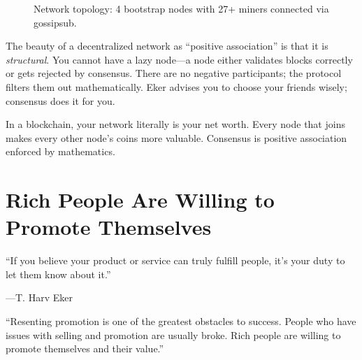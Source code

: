 \documentclass[11pt,a4paper]{article}
\begin{document}
\begin{figure}[H]
\caption{Network topology: 4 bootstrap nodes with 27+ miners connected via gossipsub.}
\label{fig:network-topology}
\end{figure}

The beauty of a decentralized network as ``positive association'' is
that it is \emph{structural}. You cannot have a lazy node---a node
either validates blocks correctly or gets rejected by consensus. There
are no negative participants; the protocol filters them out
mathematically. Eker advises you to choose your friends wisely;
consensus does it for you.

\begin{principle}[title={\textbf{The Principle}}]
In a blockchain, your network literally is your net worth.
Every node that joins makes every other node's coins more valuable.
Consensus is positive association enforced by mathematics.
\end{principle}


\section{Rich People Are Willing to Promote Themselves}

\epigraph{``If you believe your product or service can truly fulfill
people, it's your duty to let them know about it.''}%
{---T. Harv Eker}

\begin{wealthbox}[title={\raisebox{-0.5pt}{\tiny$\bigstar$} Wealth File \#8}]
``Resenting promotion is one of the greatest obstacles to success.
People who have issues with selling and promotion are usually broke.
Rich people are willing to promote themselves and their value.''
\end{wealthbox}
\end{document}

